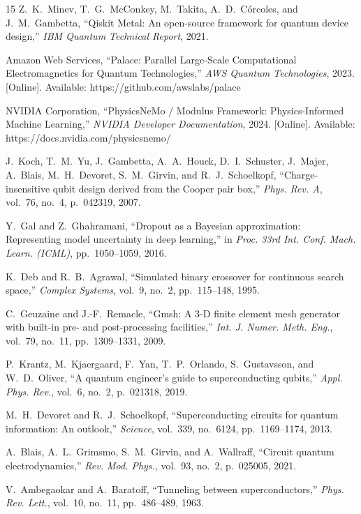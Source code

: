 \documentclass[journal,10pt,twocolumn]{IEEEtran}
\begin{document}
\begin{thebibliography}{15}
Z.~K.~Minev, T.~G.~McConkey, M.~Takita, A.~D.~C\'{o}rcoles, and J.~M.~Gambetta, ``Qiskit Metal: An open-source framework for quantum device design,'' \emph{IBM Quantum Technical Report}, 2021.

Amazon Web Services, ``Palace: Parallel Large-Scale Computational Electromagnetics for Quantum Technologies,'' \emph{AWS Quantum Technologies}, 2023. [Online]. Available: https://github.com/awslabs/palace

NVIDIA Corporation, ``PhysicsNeMo / Modulus Framework: Physics-Informed Machine Learning,'' \emph{NVIDIA Developer Documentation}, 2024. [Online]. Available: https://docs.nvidia.com/physicsnemo/

J.~Koch, T.~M.~Yu, J.~Gambetta, A.~A.~Houck, D.~I.~Schuster, J.~Majer, A.~Blais, M.~H.~Devoret, S.~M.~Girvin, and R.~J.~Schoelkopf, ``Charge-insensitive qubit design derived from the Cooper pair box,'' \emph{Phys. Rev. A}, vol.~76, no.~4, p.~042319, 2007.

Y.~Gal and Z.~Ghahramani, ``Dropout as a Bayesian approximation: Representing model uncertainty in deep learning,'' in \emph{Proc. 33rd Int. Conf. Mach. Learn. (ICML)}, pp.~1050--1059, 2016.

K.~Deb and R.~B.~Agrawal, ``Simulated binary crossover for continuous search space,'' \emph{Complex Systems}, vol.~9, no.~2, pp.~115--148, 1995.

C.~Geuzaine and J.-F.~Remacle, ``Gmsh: A 3-D finite element mesh generator with built-in pre- and post-processing facilities,'' \emph{Int. J. Numer. Meth. Eng.}, vol.~79, no.~11, pp.~1309--1331, 2009.

P.~Krantz, M.~Kjaergaard, F.~Yan, T.~P.~Orlando, S.~Gustavsson, and W.~D.~Oliver, ``A quantum engineer's guide to superconducting qubits,'' \emph{Appl. Phys. Rev.}, vol.~6, no.~2, p.~021318, 2019.

M.~H.~Devoret and R.~J.~Schoelkopf, ``Superconducting circuits for quantum information: An outlook,'' \emph{Science}, vol.~339, no.~6124, pp.~1169--1174, 2013.

A.~Blais, A.~L.~Grimsmo, S.~M.~Girvin, and A.~Wallraff, ``Circuit quantum electrodynamics,'' \emph{Rev. Mod. Phys.}, vol.~93, no.~2, p.~025005, 2021.

V.~Ambegaokar and A.~Baratoff, ``Tunneling between superconductors,'' \emph{Phys. Rev. Lett.}, vol.~10, no.~11, pp.~486--489, 1963.


\end{thebibliography}
\end{document}
